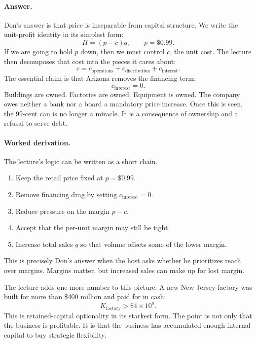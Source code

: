 \paragraph{Answer.} Don's answer is that price is inseparable from capital structure. We write the unit-profit identity in its simplest form:
\begin{equation}
\Pi=(p-c)q,\qquad p=\$0.99.
\end{equation}
If we are going to hold \(p\) down, then we must control \(c\), the unit cost. The lecture then decomposes that cost into the pieces it cares about:
\begin{equation}
c=c_{\mathrm{operations}}+c_{\mathrm{distribution}}+c_{\mathrm{interest}}.
\end{equation}
The essential claim is that Arizona removes the financing term:
\begin{equation}
c_{\mathrm{interest}}=0.
\end{equation}
Buildings are owned. Factories are owned. Equipment is owned. The company owes neither a bank nor a board a mandatory price increase. Once this is seen, the \(99\)-cent can is no longer a miracle. It is a consequence of ownership and a refusal to serve debt.

\paragraph{Worked derivation.} The lecture's logic can be written as a short chain.
\begin{enumerate}
\item Keep the retail price fixed at \(p=\$0.99\).
\item Remove financing drag by setting \(c_{\mathrm{interest}}=0\).
\item Reduce pressure on the margin \(p-c\).
\item Accept that the per-unit margin may still be tight.
\item Increase total sales \(q\) so that volume offsets some of the lower margin.
\end{enumerate}
This is precisely Don's answer when the host asks whether he prioritizes reach over margins. Margins matter, but increased sales can make up for lost margin.

The lecture adds one more number to this picture. A new New Jersey factory was built for more than \$400 million and paid for in cash:
\begin{equation}
K_{\mathrm{factory}}>\$4\times 10^8.
\end{equation}
This is retained-capital optionality in its starkest form. The point is not only that the business is profitable. It is that the business has accumulated enough internal capital to buy strategic flexibility.

